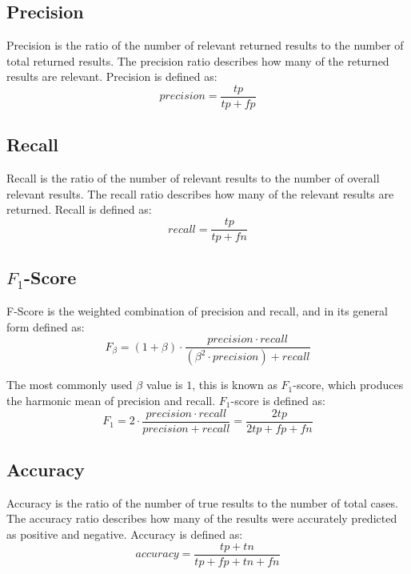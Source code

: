 \subsection*{Precision}
Precision is the ratio of the number of relevant returned results to the number of total returned results. The precision ratio describes how many of the returned results are relevant. Precision is defined as:
\begin{equation*}
    precision = \frac{tp}{tp+fp}
\end{equation*}

\subsection*{Recall}
Recall is the ratio of the number of relevant results to the number of overall relevant results. The recall ratio describes how many of the relevant results are returned.  Recall is defined as:
\begin{equation*}
    recall = \frac{tp}{tp+fn}
\end{equation*}

\subsection*{$F_{1}$-Score}
F-Score is the weighted combination of precision and recall, and in its general form defined as:
\begin{equation*}
    F_{\beta} = (1+\beta)\cdot\frac{precision\cdot recall}{(\beta ^2 \cdot precision) + recall}
\end{equation*}

The most commonly used $\beta$ value is $1$, this is known as $F_{1}$-score, which produces the harmonic mean of precision and recall. $F_{1}$-score is defined as:
\begin{equation*}
    F_{1} = 2\cdot\frac{precision\cdot recall}{precision + recall} = \frac{2tp}{2tp + fp + fn}
\end{equation*}

\subsection*{Accuracy}
Accuracy is the ratio of the number of true results to the number of total cases. The accuracy ratio describes how many of the results were accurately predicted as positive and negative. Accuracy is defined as:
\begin{equation*}
    accuracy = \frac{tp+tn}{tp+fp+tn+fn}
\end{equation*}


